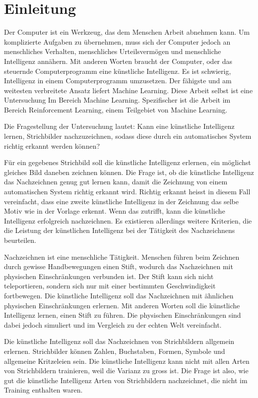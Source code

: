 \chapter{Einleitung}
Der Computer ist ein Werkzeug, das dem Menschen Arbeit abnehmen kann. Um
komplizierte Aufgaben zu übernehmen, muss sich der Computer jedoch an
menschliches Verhalten, menschliches Urteilsvermögen und menschliche Intelligenz
annähern. Mit anderen Worten braucht der Computer, oder das steuernde
Computerprogramm eine künstliche Intelligenz. Es ist schwierig, Intelligenz in
einem Computerprogramm umzusetzen. Der fähigste und am weitesten verbreitete
Ansatz liefert Machine Learning.  Diese Arbeit selbst ist eine Untersuchung Im
Bereich Machine Learning. Spezifischer ist die Arbeit im Bereich Reinforcement
Learning, einem Teilgebiet von Machine Learning.


Die Fragestellung der Untersuchung lautet: Kann eine künstliche Intelligenz
lernen, Strichbilder nachzuzeichnen, sodass diese durch ein automatisches System
richtig erkannt werden können?

Für ein gegebenes Strichbild soll die künstliche Intelligenz erlernen, ein
möglichst gleiches Bild daneben zeichnen können. Die Frage ist, ob die
künstliche Intelligenz das Nachzeichnen genug gut lernen kann, damit die
Zeichnung von einem automatischen System richtig erkannt wird. Richtig erkannt
heisst in diesem Fall vereinfacht, dass eine zweite künstliche Intelligenz in
der Zeichnung das selbe Motiv wie in der Vorlage erkennt. Wenn das zutrifft,
kann die künstliche Intelligenz erfolgreich nachzeichnen. Es existieren
allerdings weitere Kriterien, die die Leistung der künstlichen Intelligenz bei der Tätigkeit des
Nachzeichnens beurteilen.

Nachzeichnen ist eine menschliche Tätigkeit. Menschen führen beim Zeichnen durch
gewisse Handbewegungen einen Stift, wodurch das Nachzeichnen mit physischen
Einschränkungen verbunden ist. Der Stift kann sich nicht teleportieren, sondern
sich nur mit einer bestimmten Geschwindigkeit fortbewegen. Die künstliche
Intelligenz soll das Nachzeichnen mit ähnlichen physischen Einschränkungen
erlernen. Mit anderen Worten soll die künstliche Intelligenz lernen, einen Stift
zu führen.  Die physischen Einschränkungen sind dabei jedoch simuliert und im
Vergleich zu der echten Welt vereinfacht. 

Die künstliche Intelligenz soll das Nachzeichnen von Strichbildern allgemein
erlernen. Strichbilder können Zahlen, Buchstaben, Formen, Symbole und allgemeine
Kritzeleien sein. Die künstliche Intelligenz kann nicht mit allen Arten von
Strichbildern trainieren, weil die Varianz zu gross ist. Die Frage ist also, wie
gut die künstliche Intelligenz Arten von Strichbildern nachzeichnet, die nicht im Training
enthalten waren.

